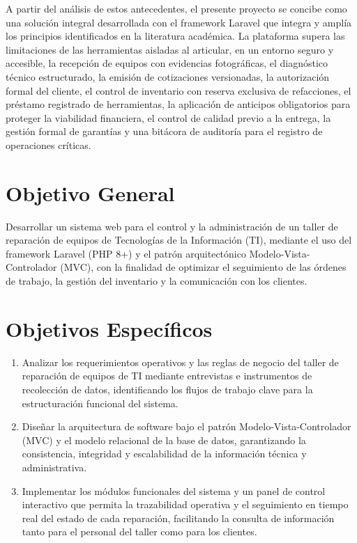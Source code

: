 A partir del análisis de estos antecedentes, el presente proyecto se concibe como una solución integral desarrollada con el framework Laravel que integra y amplía los principios identificados en la literatura académica. La plataforma supera las limitaciones de las herramientas aisladas al articular, en un entorno seguro y accesible, la recepción de equipos con evidencias fotográficas, el diagnóstico técnico estructurado, la emisión de cotizaciones versionadas, la autorización formal del cliente, el control de inventario con reserva exclusiva de refacciones, el préstamo registrado de herramientas, la aplicación de anticipos obligatorios para proteger la viabilidad financiera, el control de calidad previo a la entrega, la gestión formal de garantías y una bitácora de auditoría para el registro de operaciones críticas.

\section{Objetivo General}

Desarrollar un sistema web para el control y la administración de un taller de reparación de equipos de Tecnologías de la Información (TI), mediante el uso del framework Laravel (PHP 8+) y el patrón arquitectónico Modelo-Vista-Controlador (MVC), con la finalidad de optimizar el seguimiento de las órdenes de trabajo, la gestión del inventario y la comunicación con los clientes.

\section{Objetivos Específicos}

\begin{enumerate}
    \item Analizar los requerimientos operativos y las reglas de negocio del taller de reparación de equipos de TI mediante entrevistas e instrumentos de recolección de datos, identificando los flujos de trabajo clave para la estructuración funcional del sistema.
    \item Diseñar la arquitectura de software bajo el patrón Modelo-Vista-Controlador (MVC) y el modelo relacional de la base de datos, garantizando la consistencia, integridad y escalabilidad de la información técnica y administrativa.
    \item Implementar los módulos funcionales del sistema y un panel de control interactivo que permita la trazabilidad operativa y el seguimiento en tiempo real del estado de cada reparación, facilitando la consulta de información tanto para el personal del taller como para los clientes.
\end{enumerate}

